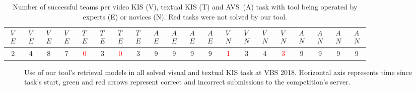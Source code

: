 \begin{table}[h]
	
	\centering
	\begin{tabular}{cccc|cccc|cccc|cccc|cccc}
		\toprule
		$\substack{V \\ E}$ & $\substack{V \\ E}$ & $\substack{V \\ E}$ & $\substack{V \\ E}$ & $\substack{T \\ E}$ & $\substack{T \\ E}$ & $\substack{T \\ E}$ & $\substack{T \\ E}$ & $\substack{A \\ E}$ & $\substack{A \\ E}$ & $\substack{A \\ E}$ & $\substack{A \\ E}$ & $\substack{V \\ N}$ & $\substack{V \\ N}$ & $\substack{V \\ N}$ & $\substack{V \\ N}$ & $\substack{A \\ N}$ & $\substack{A \\ N}$ & $\substack{A \\ N}$ & $\substack{A \\ N}$ \\
		\midrule
		2 & 4 & 8 & 7 & \textcolor{red}{0} & 3 & \textcolor{red}{0} & 3 & 9 & 9 & 9 & 9 & \textcolor{red}{1} & 3 & 4 & \textcolor{red}{3} & 9 & 9 & 9 & 9 \\
		\bottomrule
	\end{tabular}
	
	\caption[Number of successful teams per task at VBS 2018]{Number of successful teams per video KIS (V), textual KIS (T) and AVS~(A) task with tool being operated by experts (E) or novices (N). Red tasks were not solved by our tool.}
	\label{fig:vbs_tasks}
\end{table}

\begin{figure}
	\centering
	
	
	\caption[Use of tool's retrieval models in KIS tasks]{Use of our tool's retrieval models in all solved visual and textual KIS task at VBS 2018. Horizontal axis represents time since task's start, green and red arrows represent correct and incorrect submissions to the competition's server.}
	\label{fig:vbs_tasks_timeline}
\end{figure}
